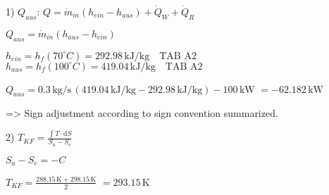 1) \( Q_{aus} \):  
\( Q = \dot{m}_{in} (h_{ein} - h_{aus}) + \dot{Q}_{W} + \dot{Q}_{R} \)  

\( Q_{aus} = \dot{m}_{in} (h_{aus} - h_{ein}) \)  

\( h_{ein} = h_f (70^\circ C) = 292.98 \, \text{kJ/kg} \quad \text{TAB A2} \)  
\( h_{aus} = h_f (100^\circ C) = 419.04 \, \text{kJ/kg} \quad \text{TAB A2} \)  

\( Q_{aus} = 0.3 \, \text{kg/s} \, (419.04 \, \text{kJ/kg} - 292.98 \, \text{kJ/kg}) - 100 \, \text{kW} \)  
\( = -62.182 \, \text{kW} \)  

=> Sign adjustment according to sign convention summarized.  

2)  
\( T_{KF} = \frac{\int T \cdot \text{d}S}{S_a - S_e} \)  

\( S_a - S_e = -C \)  

\( T_{KF} = \frac{288.15 \, \text{K} + 298.15 \, \text{K}}{2} \)  
\( = 293.15 \, \text{K} \)
